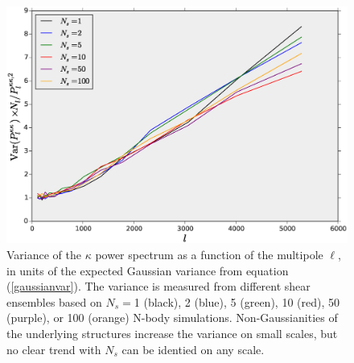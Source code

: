 \documentclass[reprint,aps,prd,superscriptaddress,showkeys,showpacs]{revtex4-1}
\begin{document}
\begin{figure}
\includegraphics[scale=0.3]{Figures/ps_variance.eps}
\caption{Variance of the $\kappa$ power spectrum as a function of the
  multipole $\ell$, in units of the expected Gaussian variance from
  equation (\ref{gaussianvar}). The variance is measured from
  different shear ensembles based on $N_s=$1 (black), 2 (blue), 5
  (green), 10 (red), 50 (purple), or 100 (orange) N-body simulations. 
  Non-Gaussianities of the underlying structures increase the variance on
  small scales, but no clear trend with $N_s$ can be identied on any scale.}
\label{ps_var}
\end{figure}
\end{document}
